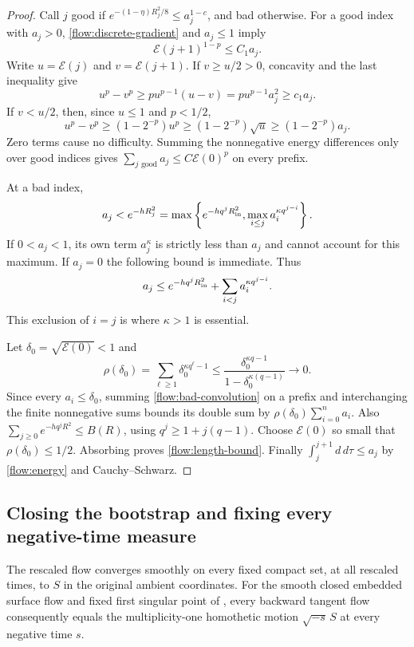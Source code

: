 \begin{proof}
Call $j$ good if
$e^{-(1-\eta)R_j^2/8}\le a_j^{1-c}$, and bad otherwise.
For a good index with $a_j>0$, \eqref{flow:discrete-gradient}
and $a_j\le1$ imply
\[
 \mathcal E(j+1)^{1-p}\le C_1a_j.
\]
Write $u=\mathcal E(j)$ and $v=\mathcal E(j+1)$.  If $v\ge u/2>0$,
concavity and the last inequality give
\[
 u^p-v^p\ge p u^{p-1}(u-v)
          =p u^{p-1}a_j^2\ge c_1a_j.
\]
If $v<u/2$, then, since $u\le1$ and $p<1/2$,
\[
 u^p-v^p\ge(1-2^{-p})u^p
           \ge(1-2^{-p})\sqrt u\ge(1-2^{-p})a_j.
\]
Zero terms cause no difficulty.  Summing the nonnegative energy
differences only over good indices gives
$\sum_{j\text{ good}}a_j\le C\mathcal E(0)^p$ on every prefix.

At a bad index,
\begin{equation}\label{flow:bad-max}
 a_j<e^{-hR_j^2}
 =\max\left\{e^{-hq^jR_{\rm in}^2},
                \max_{i\le j}a_i^{\kappa q^{j-i}}\right\}.
\end{equation}
If $0<a_j<1$, its own term $a_j^\kappa$ is strictly less
than $a_j$ and cannot account for this maximum.  If $a_j=0$
the following bound is immediate.  Thus
\begin{equation}\label{flow:bad-convolution}
 a_j\le e^{-hq^jR_{\rm in}^2}
                  +\sum_{i<j}a_i^{\kappa q^{j-i}}.
\end{equation}
This exclusion of $i=j$ is where $\kappa>1$ is essential.

Let $\delta_0=\sqrt{\mathcal E(0)}<1$ and
\[
 \rho(\delta_0)=\sum_{\ell\ge1}
                   \delta_0^{\kappa q^\ell-1}
 \le\frac{\delta_0^{\kappa q-1}}
              {1-\delta_0^{\kappa(q-1)}}\longrightarrow0.
\]
Since every $a_i\le\delta_0$, summing
\eqref{flow:bad-convolution} on a prefix and interchanging
the finite nonnegative sums bounds its double sum by
$\rho(\delta_0)\sum_{i=0}^n a_i$.  Also
$\sum_{j\ge0}e^{-hq^jR^2}\le B(R)$, using
$q^j\ge1+j(q-1)$.  Choose $\mathcal E(0)$ so small that
$\rho(\delta_0)\le1/2$.  Absorbing proves
\eqref{flow:length-bound}.  Finally
$\int_j^{j+1}d\,d\tau\le a_j$ by
\eqref{flow:energy} and Cauchy--Schwarz.
\end{proof}

\subsection{Closing the bootstrap and fixing every negative-time measure}

\begin{proposition}
\label{flow:uniqueness}
The rescaled flow converges smoothly on every fixed compact set,
at all rescaled times, to $S$ in the original ambient coordinates.
For the smooth closed embedded surface flow and fixed first singular
point of , every backward tangent flow consequently equals
the multiplicity-one homothetic motion $\sqrt{-s}\,S$ at every
negative time $s$.
\end{proposition}

